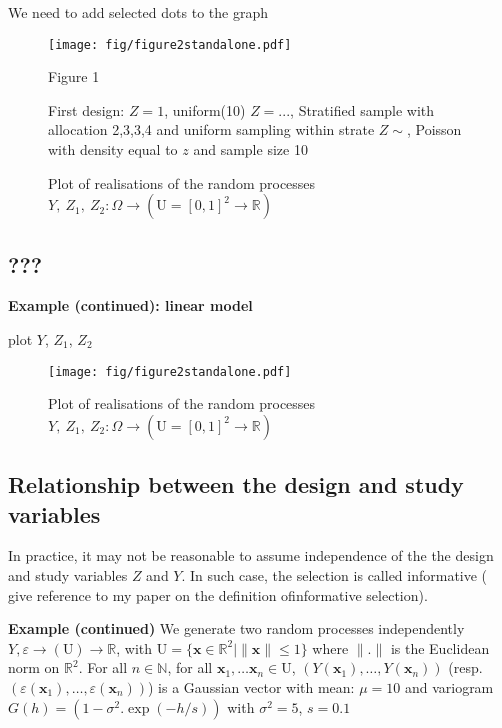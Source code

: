 \documentclass[12pt]{article}
\theoremstyle{definition}
\theoremstyle{remark}
\newcommand{\Semivariogram}{G}
\newcommand{\Pop}{\mathrm{U}}
\newcommand{\position}{\mathbf{x}}
\newcommand{\Signal}{Y}
\newcommand{\Desvar}{Z}
\begin{document}
{\color{red}
We need to add selected dots to the graph}


\begin{figure}[H]
\hspace{-.6cm}
    \texttt{[image: fig/figure2standalone.pdf]}
    \vspace{-1cm}
    
Figure 1    
    \caption{Plot of realisations of the random processes $\Signal,~\Desvar_1,~\Desvar_2:\Omega\to(\Pop=[0,1]^2\to\mathbb{R})$}
    \label{fig:oaijsfdwefweoij}
    
    First design:
    $Z=1$, uniform(10)
    $Z=...$, Stratified sample with allocation 2,3,3,4 and uniform sampling within strate
    $Z\sim$, Poisson with density equal to $z$ and sample size 10
\end{figure}

\subsection{???}

{\bf Example (continued): linear model}

{\color{red} plot $Y$, $Z_1$, $Z_2$ }  

\begin{figure}[H]
\hspace{-.6cm}
    \texttt{[image: fig/figure2standalone.pdf]}
    \vspace{-1cm}
    \caption{Plot of realisations of the random processes $\Signal,~\Desvar_1,~\Desvar_2:\Omega\to(\Pop=[0,1]^2\to\mathbb{R})$}
    \label{fig:oaijsfdwefweoij}
\end{figure}


\subsection{Relationship between the design and study variables}

In practice, it may not be reasonable to assume independence of the the design and study variables $\Desvar$ and $\Signal$. 
In such case, the selection is called informative ({\color{red} give reference to my paper on the definition ofinformative selection}).

\textbf{Example (continued)}
We generate two random processes independently 
$\Signal,\varepsilon\to\left(\Pop\right)\to\mathbb{R}$, with $\Pop=\{\position\in\mathbb{R}^2\mid \|\position\|\leq 1\}$ where $\|.\|$ is the Euclidean norm on $\mathbb{R}^2$.
For all $n\in\mathbb{N}$, for all $\position_1,\ldots\position_n\in\Pop$, 
$\left(\Signal(\position_1),\ldots,\Signal(\position_n)\right)$ (resp. $\left(\varepsilon(\position_1),\ldots,\varepsilon(\position_n)\right)$)  is a Gaussian vector with mean:
$\mu=10$ and variogram $\Semivariogram\left(h\right)=(1-\sigma^2.\exp(-h/s))$
with $\sigma^2=5$, $s=0.1$
\end{document}
